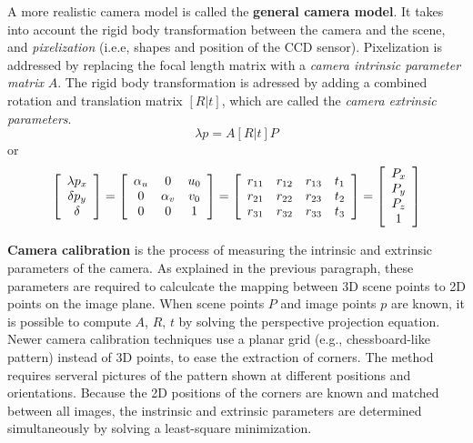 {A more realistic camera model is called the \textbf{general camera model}.
It takes into account the rigid body transformation between the camera and the scene, and \textit{pixelization} (i.e.e, shapes and position of the CCD sensor).
Pixelization is addressed by replacing the focal length matrix with a \textit{camera intrinsic parameter matrix} $A$.
The rigid body transformation is adressed by adding a combined rotation and translation matrix $[R|t]$, which are called the \textit{camera extrinsic parameters}.
\begin{equation}
\lambda p = A [ R | t] P
\end{equation}
or
\begin{equation}
\left[ \begin{array}{c}
\lambda p_x \\
\delta p_y \\
\delta
\end{array} \right]
=
\left[ \begin{array}{c c c}
\alpha_u & 0 & u_0 \\
0 & \alpha_v & v_0 \\
0 & 0 & 1
\end{array} \right]
=
\left[ \begin{array}{c c c c}
r_{11} & r_{12} & r_{13} & t_1 \\
r_{21} & r_{22} & r_{23} & t_2 \\
r_{31} & r_{32} & r_{33} & t_3
\end{array} \right]
=
\left[ \begin{array}{c}
P_x \\
P_y \\
P_z \\
1
\end{array} \right]
\end{equation}

\textbf{Camera calibration} is the process of measuring the intrinsic and extrinsic parameters of the camera.
As explained in the previous paragraph, these parameters are required to calculcate the mapping between 3D scene points to 2D points on the image plane.
When scene points $P$ and image points $p$ are known, it is possible to compute $A$, $R$, $t$ by solving the perspective projection equation.
Newer camera calibration techniques use a planar grid (e.g., chessboard-like pattern) instead of 3D points, to ease the extraction of corners.
The method requires serveral pictures of the pattern shown at different positions and orientations.
Because the 2D positions of the corners are known and matched between all images, the instrinsic and extrinsic parameters are determined simultaneously by solving a least-square minimization.

}
